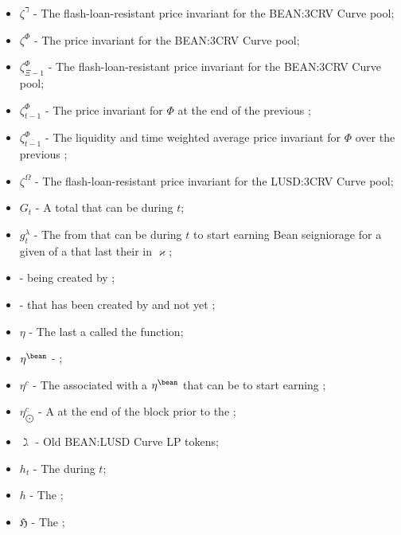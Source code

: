 \documentclass[class=article, crop=false]{standalone}
\begin{document}
\begin{itemize}[topsep=0pt, itemsep=3pt,leftmargin=16pt]
    \item[] $\zeta^{\daleth}$ - The flash-loan-resistant price invariant for the BEAN:3CRV Curve pool;
    \item[] $\zeta^{\Phi}$ - The price invariant for the BEAN:3CRV Curve pool;
    \item[] $\zeta^{\Phi}_{\Xi-1}$ - The flash-loan-resistant price invariant for the BEAN:3CRV Curve pool;
    \item[] $\zeta^{\Phi}_{t-1}$ - The price invariant for $\Phi$ at the end of the previous ;
    \item[] $\zeta^{\Phi}_{\overline{t-1}}$ - The liquidity and time weighted average price invariant for $\Phi$ over the previous ;
    \item[] $\zeta^{\Omega}$ - The flash-loan-resistant price invariant for the LUSD:3CRV Curve pool;
    \item[] $G_t$ - A  total   that can be  during $t$;
    \item[] $g_{t}^{\lambda}$ - The   from  that can be  during $t$ to start earning Bean seigniorage for a given  of a  that last  their   in $\varkappa$;
    \item[]  -  being created by ;
    \item[]   -  that has been created by  and not yet ;
    \item[] $\eta$ - The last  a  called the  function;
    \item[] $\eta^{\bean}$ -  \Bean;
    \item[] $\eta^{c}$ - The   associated with a  $\eta^{\bean}$ that can be  to start earning  ;
    \item[] $\eta_{\bigodot}^c$ - A    at the end of the block prior to the ;
    \item[] $\gimel$ - Old BEAN:LUSD Curve LP tokens;
    \item[] $h_t$ - The  during $t$;
    \item[] $h$ - The ;
    \item[] $\mathfrak{H}$ - The ;

\end{itemize}
\end{document}
